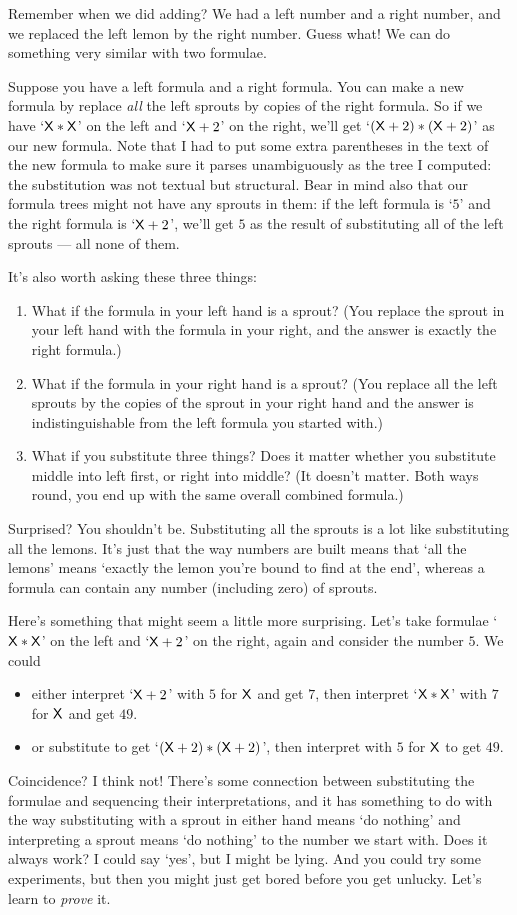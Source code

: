 \documentclass{book}
\begin{document}
Remember when we did adding? We had a left number and a right number, and we replaced the left lemon by the right number. Guess what! We can do something very similar with two formulae.

Suppose you have a left formula and a right formula. You can make a new formula by replace \emph{all} the left sprouts by copies of the right formula. So if we have `$\mathsf{X}*\mathsf{X}$' on the left and `$\mathsf{X}+2$' on the right, we'll get `$(\mathsf{X}+2)*(\mathsf{X}+2)$' as our new formula. Note that I had to put some extra parentheses in the text of the new formula to make sure it parses unambiguously as the tree I computed: the substitution was not textual but structural. Bear in mind also that our formula trees might not have any sprouts in them: if the left formula is `$5$' and the right formula is `$\mathsf{X}+2$', we'll get $5$ as the result of substituting all of the left sprouts --- all none of them.

It's also worth asking these three things:
\begin{enumerate}
\item What if the formula in your left hand is a sprout? (You replace the sprout in your left hand with the formula in your right, and the answer is exactly the right formula.)
\item What if the formula in your right hand is a sprout? (You replace all the left sprouts by the copies of the sprout in your right hand and the answer is indistinguishable from the left formula you started with.)
\item What if you substitute three things? Does it matter whether you substitute middle into left first, or right into middle? (It doesn't matter. Both ways round, you end up with the same overall combined formula.)
\end{enumerate}

Surprised? You shouldn't be. Substituting all the sprouts is a lot like substituting all the lemons. It's just that the way numbers are built means that `all the lemons' means `exactly the lemon you're bound to find at the end', whereas a formula can contain any number (including zero) of sprouts.

Here's something that might seem a little more surprising. Let's take formulae `$\mathsf{X}*\mathsf{X}$' on the left and `$\mathsf{X}+2$' on the right, again and consider the number $5$. We could
\begin{itemize}
\item either interpret `$\mathsf{X}+2$' with $5$ for $\mathsf{X}$ and get $7$, then interpret `$\mathsf{X}*\mathsf{X}$' with $7$ for $\mathsf{X}$ and get $49$.
\item or substitute to get `$(\mathsf{X}+2)*(\mathsf{X}+2)$', then interpret with $5$ for $\mathsf{X}$ to get $49$.
\end{itemize}
Coincidence? I think not! There's some connection between substituting the formulae and sequencing their interpretations, and it has something to do with the way substituting with a sprout in either hand means `do nothing' and interpreting a sprout means `do nothing' to the number we start with. Does it always work? I could say `yes', but I might be lying. And you could try some experiments, but then you might just get bored before you get unlucky. Let's learn to \emph{prove} it.
\end{document}

